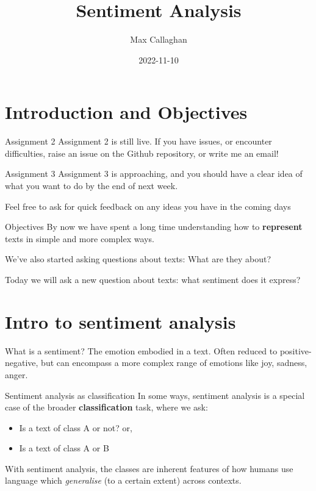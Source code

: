 \documentclass[
  10pt,
  ignorenonframetext,
  aspectratio=169]{beamer}
\title{Sentiment Analysis}
\author{Max Callaghan}
\date{2022-11-10}
\providecommand{\tightlist}{%
  \setlength{\itemsep}{0pt}\setlength{\parskip}{0pt}}
\begin{document}
\frame{\titlepage}

\hypertarget{introduction-and-objectives}{%
\section{Introduction and
Objectives}\label{introduction-and-objectives}}

\begin{frame}{Assignment 2}
\protect\hypertarget{assignment-2}{}
Assignment 2 is still live. If you have issues, or encounter
difficulties, raise an issue on the Github repository, or write me an
email!
\end{frame}

\begin{frame}{Assignment 3}
\protect\hypertarget{assignment-3}{}
Assignment 3 is approaching, and you should have a clear idea of what
you want to do by the end of next week.

Feel free to ask for quick feedback on any ideas you have in the coming
days
\end{frame}

\begin{frame}{Objectives}
\protect\hypertarget{objectives}{}
By now we have spent a long time understanding how to \textbf{represent}
texts in simple and more complex ways.

We've also started asking questions about texts: What are they about?

Today we will ask a new question about texts: what sentiment does it
express?
\end{frame}

\hypertarget{intro-to-sentiment-analysis}{%
\section{Intro to sentiment
analysis}\label{intro-to-sentiment-analysis}}

\begin{frame}{What is a sentiment?}
\protect\hypertarget{what-is-a-sentiment}{}
The emotion embodied in a text. Often reduced to positive-negative, but
can encompass a more complex range of emotions like joy, sadness, anger.
\end{frame}

\begin{frame}{Sentiment analysis as classification}
\protect\hypertarget{sentiment-analysis-as-classification}{}
In some ways, sentiment analysis is a special case of the broader
\textbf{classification} task, where we ask:

\begin{itemize}
\tightlist
\item
  Is a text of class A or not? or,
\item
  Is a text of class A or B
\end{itemize}

With sentiment analysis, the classes are inherent features of how humans
use language which \emph{generalise} (to a certain extent) across
contexts.
\end{frame}
\end{document}
